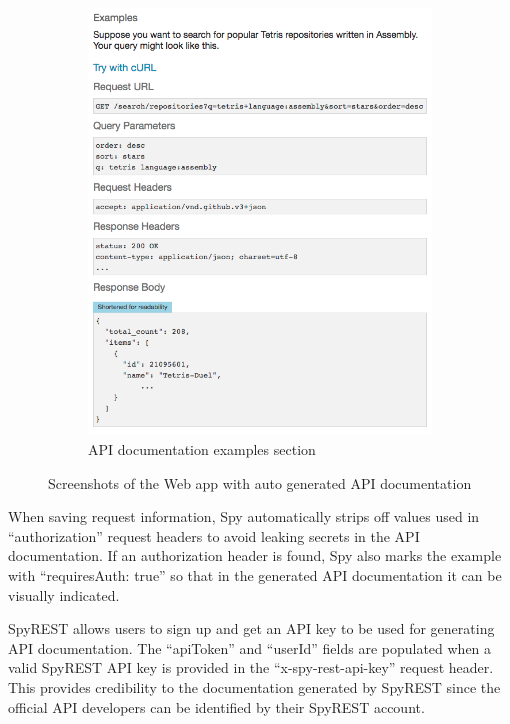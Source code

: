 \documentclass[conference]{IEEEtran}
\begin{document}
\begin{figure}[!tbh]
\begin{subfigure}[t]{0.5\textwidth}
    \includegraphics[width=\linewidth]{spyrest_examples.png}
    \caption{API documentation examples section}
    \label{fig:examples}
  \end{subfigure}
  \caption{Screenshots of the Web app with auto generated API documentation}
  \label{fig:spyrest_screenshots}
\end{figure}


When saving request information, Spy automatically strips off values used in ``authorization'' request headers to avoid leaking secrets in the API documentation. If an authorization header is found, Spy also marks the example with ``requiresAuth: true'' so that in the generated API documentation it can be visually indicated.

SpyREST allows users to sign up and get an API key to be used for generating API documentation. The ``apiToken'' and ``userId'' fields are populated when a valid SpyREST API key is provided in the ``x-spy-rest-api-key'' request header. This provides credibility to the documentation generated by SpyREST since the official API developers can be identified by their SpyREST account.
\end{document}
